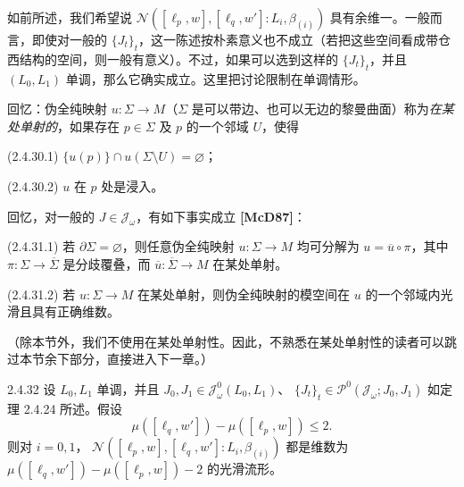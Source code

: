如前所述，我们希望说
$\mathcal N([\ell_p,w],[\ell_q,w']:L_i,\beta_{(i)})$ 具有余维一。一般而言，即使对一般的 $\{J_t\}_t$，这一陈述按朴素意义也不成立（若把这些空间看成带仓西结构的空间，则一般有意义）。不过，如果可以选到这样的 $\{J_t\}_t$，并且 $(L_0,L_1)$ 单调，那么它确实成立。这里把讨论限制在单调情形。

回忆：伪全纯映射 $u:\Sigma\to M$（$\Sigma$ 是可以带边、也可以无边的黎曼曲面）称为\emph{在某处单射的}，如果存在 $p\in\Sigma$ 及 $p$ 的一个邻域 $U$，使得
\par\smallskip\noindent\textup{(2.4.30.1)}\quad
$\{u(p)\}\cap u(\Sigma\setminus U)=\varnothing$；


\par\smallskip\noindent\textup{(2.4.30.2)}\quad
$u$ 在 $p$ 处是浸入。

回忆，对一般的 $J\in\mathcal J_\omega$，有如下事实成立 \textbf{[McD87]}：

\par\smallskip\noindent\textup{(2.4.31.1)}\quad
若 $\partial\Sigma=\varnothing$，则任意伪全纯映射 $u:\Sigma\to M$ 均可分解为
$u=\overline u\circ\pi$，其中 $\pi:\Sigma\to\overline\Sigma$ 是分歧覆叠，而
$\overline u:\overline\Sigma\to M$ 在某处单射。

\par\smallskip\noindent\textup{(2.4.31.2)}\quad
若 $u:\Sigma\to M$ 在某处单射，则伪全纯映射的模空间在 $u$ 的一个邻域内光滑且具有正确维数。

（除本节外，我们不使用在某处单射性。因此，不熟悉在某处单射性的读者可以跳过本节余下部分，直接进入下一章。）

\begin{theorem}{2.4.32}\label{thm:2-4-32}
设 $L_0,L_1$ 单调，并且 $J_0,J_1\in\mathcal J_\omega^0(L_0,L_1)$、
$\{J_t\}_t\in\mathcal P^0(\mathcal J_\omega;J_0,J_1)$ 如定理 2.4.24 所述。假设
\begin{equation}
  \mu([\ell_q,w'])-\mu([\ell_p,w])\leq2.
  \tag{2.4.33}\label{eq:2-4-33}
\end{equation}
则对 $i=0,1$，
$\mathcal N([\ell_p,w],[\ell_q,w']:L_i,\beta_{(i)})$ 都是维数为
$\mu([\ell_q,w'])-\mu([\ell_p,w])-2$ 的光滑流形。
\end{theorem}

